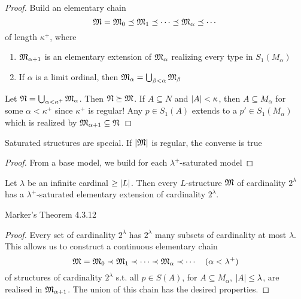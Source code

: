 \documentclass[11pt]{article}
\begin{document}
\begin{proof}
Build an elementary chain
\begin{equation*}
\mathfrak{M}=\mathfrak{M}_0\preceq\mathfrak{M}_1\preceq\cdots\preceq\mathfrak{M}_\alpha\preceq\cdots
\end{equation*}
of length \(\kappa^+\), where
\begin{enumerate}
\item \(\mathfrak{M}_{\alpha+1}\) is an elementary extension of \(\mathfrak{M}_\alpha\) realizing every type in \(S_1(M_\alpha)\)
\item If \(\alpha\) is a limit ordinal, then \(\mathfrak{M}_\alpha=\bigcup_{\beta<\alpha}\mathfrak{M}_\beta\)
\end{enumerate}


Let \(\mathfrak{N}=\bigcup_{\alpha<\kappa^+}\mathfrak{M}_\alpha\). Then \(\mathfrak{N}\succeq\mathfrak{M}\). If \(A\subseteq N\) and \(\abs{A}<\kappa\), then \(A\subseteq M_\alpha\) for
some \(\alpha<\kappa^+\) since \(\kappa^+\) is regular! Any \(p\in S_1(A)\)  extends to a \(p'\in S_1(M_\alpha)\) which is
realized by \(\mathfrak{M}_{\alpha+1}\subseteq\mathfrak{N}\)
\end{proof}


\begin{remark}
Saturated structures are special. If \(\abs{\fM}\) is regular, the converse is true \label{Problem8}
\end{remark}

\begin{proof}
From a base model, we build for each \(\lambda^+\)-saturated model
\end{proof}

\begin{lemma}[]
Let \(\lambda\) be an infinite cardinal \(\ge\abs{L}\). Then every \(L\)-structure \(\mathfrak{M}\) of
cardinality \(2^\lambda\) has a \(\lambda^+\)-saturated elementary extension of cardinality \(2^\lambda\).
\end{lemma}

Marker's Theorem 4.3.12

\begin{proof}
Every set of cardinality \(2^\lambda\) has \(2^\lambda\) many subsets of cardinality at most \(\lambda\).
This allows us to construct a continuous elementary chain
\begin{equation*}
\mathfrak{M}=\mathfrak{M}_0\prec\mathfrak{M}_1\prec\cdots\prec\mathfrak{M}_\alpha\prec\cdots\quad(\alpha<\lambda^+)
\end{equation*}
of structures of cardinality \(2^\lambda\) s.t. all \(p\in S(A)\), for \(A\subseteq M_\alpha\), \(\abs{A}\le\lambda\), are
realised in \(\mathfrak{M}_{\alpha+1}\). The union of this chain has the desired properties.
\end{proof}
\end{document}
